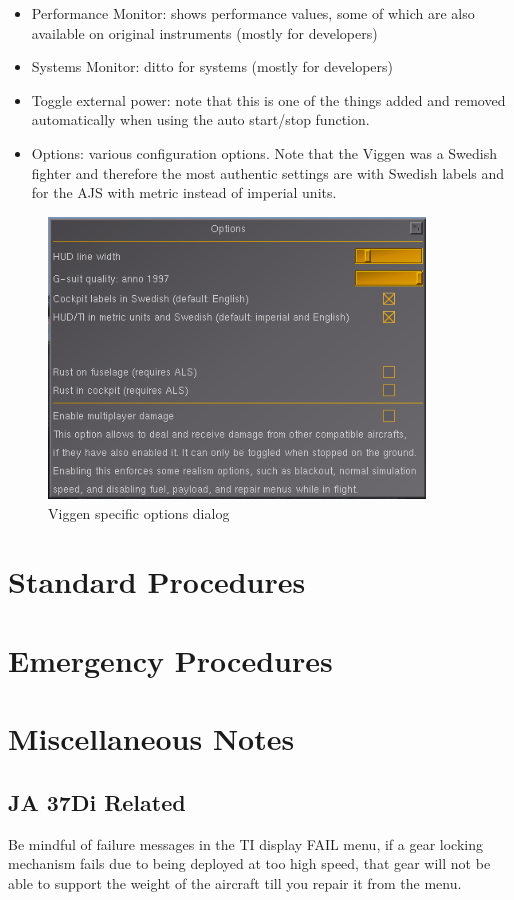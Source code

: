 \documentclass[a4paper]{report}
\begin{document}
\begin{itemize}
\item Performance Monitor: shows performance values, some of which are also available on original instruments (mostly for developers)
\item Systems Monitor: ditto for systems (mostly for developers)
\item Toggle external power: note that this is one of the things added and removed automatically when using the auto start/stop function.
\item Options: various configuration options. Note that the Viggen was a Swedish fighter and therefore the most authentic settings are with Swedish labels and for the AJS with metric instead of imperial units.
\end{itemize}

\begin{figure}[h]
\centering
 \includegraphics[width=10cm]{images/fg_option_config.png}
 \caption{Viggen specific options dialog}
\end{figure}


\chapter{Standard Procedures}
\chapter{Emergency Procedures}
\chapter{Miscellaneous Notes}
\section{JA 37Di Related}
Be mindful of failure messages in the TI display FAIL menu, if a gear locking mechanism fails due to being deployed at too high speed, that gear will not be able to support the weight of the aircraft till you repair it from the menu.
\end{document}
